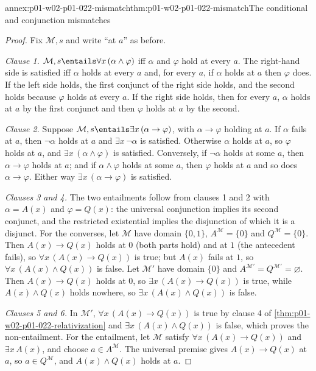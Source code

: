\begin{annexitem}{annex:p01-w02-p01-022-mismatch}{thm:p01-w02-p01-022-mismatch}{The conditional and conjunction mismatches}
\begin{proof}
Fix \(\mathcal M,s\) and write ``at \(a\)'' as before.

\emph{Clause 1.} \(\mathcal M,s\entails\forall x\,(\alpha\land\varphi)\) iff
\(\alpha\) and \(\varphi\) hold at every \(a\). The right-hand side is
satisfied iff \(\alpha\) holds at every \(a\) and, for every \(a\), if
\(\alpha\) holds at \(a\) then \(\varphi\) does. If the left side holds, the
first conjunct of the right side holds, and the second holds because
\(\varphi\) holds at every \(a\). If the right side holds, then for every
\(a\), \(\alpha\) holds at \(a\) by the first conjunct and then \(\varphi\)
holds at \(a\) by the second.

\emph{Clause 2.} Suppose \(\mathcal M,s\entails\exists x\,(\alpha\to
\varphi)\), with \(\alpha\to\varphi\) holding at \(a\). If \(\alpha\) fails
at \(a\), then \(\neg\alpha\) holds at \(a\) and \(\exists x\,\neg\alpha\) is
satisfied. Otherwise \(\alpha\) holds at \(a\), so \(\varphi\) holds at
\(a\), and \(\exists x\,(\alpha\land\varphi)\) is satisfied. Conversely, if
\(\neg\alpha\) holds at some \(a\), then \(\alpha\to\varphi\) holds at \(a\);
and if \(\alpha\land\varphi\) holds at some \(a\), then \(\varphi\) holds at
\(a\) and so does \(\alpha\to\varphi\). Either way
\(\exists x\,(\alpha\to\varphi)\) is satisfied.

\emph{Clauses 3 and 4.} The two entailments follow from clauses 1 and 2 with
\(\alpha=A(x)\) and \(\varphi=Q(x)\): the universal conjunction implies its
second conjunct, and the restricted existential implies the disjunction of
which it is a disjunct. For the converses, let \(\mathcal M\) have domain
\(\{0,1\}\), \(A^{\mathcal M}=\{0\}\) and \(Q^{\mathcal M}=\{0\}\). Then
\(A(x)\to Q(x)\) holds at \(0\) (both parts hold) and at \(1\) (the antecedent
fails), so \(\forall x\,(A(x)\to Q(x))\) is true; but \(A(x)\) fails at
\(1\), so \(\forall x\,(A(x)\land Q(x))\) is false. Let \(\mathcal M'\) have
domain \(\{0\}\) and \(A^{\mathcal M'}=Q^{\mathcal M'}=\varnothing\). Then
\(A(x)\to Q(x)\) holds at \(0\), so \(\exists x\,(A(x)\to Q(x))\) is true,
while \(A(x)\land Q(x)\) holds nowhere, so \(\exists x\,(A(x)\land Q(x))\) is
false.

\emph{Clauses 5 and 6.} In \(\mathcal M'\), \(\forall x\,(A(x)\to Q(x))\) is true
by clause 4 of \cref{thm:p01-w02-p01-022-relativization} and
\(\exists x\,(A(x)\land Q(x))\) is false, which proves the non-entailment.
For the entailment, let \(\mathcal M\) satisfy
\(\forall x\,(A(x)\to Q(x))\) and \(\exists x\,A(x)\), and choose
\(a\in A^{\mathcal M}\). The universal premise gives \(A(x)\to Q(x)\) at
\(a\), so \(a\in Q^{\mathcal M}\), and \(A(x)\land Q(x)\) holds at \(a\).
\end{proof}
\end{annexitem}

